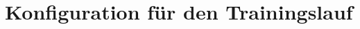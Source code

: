 \section{Konfiguration für den Trainingslauf}\label{Anhang.config}
\begin{multicols}{2}
  \small
  

\end{multicols}
